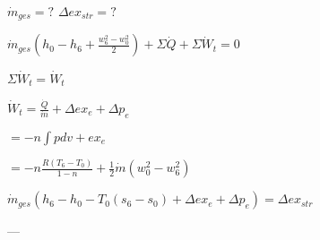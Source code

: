 \( \dot{m}_{ges} = ? \)  
\( \Delta ex_{str} = ? \)  

\( \dot{m}_{ges} \left( h_0 - h_6 + \frac{w_6^2 - w_0^2}{2} \right) + \Sigma \dot{Q} + \Sigma \dot{W}_t = 0 \)  

\( \Sigma \dot{W}_t = \dot{W}_t \)  

\( \dot{W}_t = \frac{\dot{Q}}{\dot{m}} + \Delta ex_e + \Delta p_e \)  

\( = -n \int pdv + ex_e \)  

\( = -n \frac{R (T_6 - T_0)}{1 - n} + \frac{1}{2} \dot{m} (w_0^2 - w_6^2) \)  

\( \dot{m}_{ges} \left( h_6 - h_0 - T_0 (s_6 - s_0) + \Delta ex_e + \Delta p_e \right) = \Delta ex_{str} \)  

---